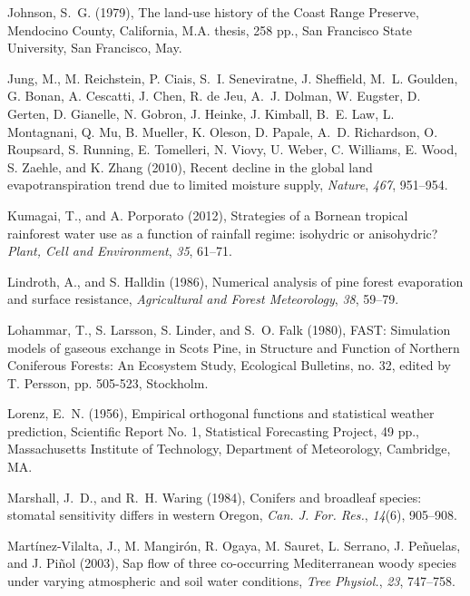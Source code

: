 Johnson, S.~G. (1979), The land-use history of the Coast Range Preserve, Mendocino County, California, 
M.A. thesis, 258 pp., San Francisco State University, San Francisco, May.

Jung, M., M. Reichstein, P. Ciais, S.~I. Seneviratne, J. Sheffield, M.~L. Goulden, G. Bonan, A. Cescatti, J. Chen, R. de Jeu, A.~J. Dolman, W. Eugster, D. Gerten, D. Gianelle, N. Gobron, J. Heinke, J. Kimball, B.~E. Law, L. Montagnani, Q. Mu, B. Mueller, K. Oleson, D. Papale, A.~D. Richardson, O. Roupsard, S. Running, E. Tomelleri, N. Viovy, U. Weber, C. Williams, E. Wood, S. Zaehle, and K. Zhang (2010), Recent decline in the global land evapotranspiration trend due to limited moisture supply, 
\textit{Nature}, \textit{467}, 951--954.

Kumagai, T., and A. Porporato (2012), Strategies of a Bornean tropical rainforest water use as a function of rainfall regime: isohydric or anisohydric? 
\textit{Plant, Cell and Environment}, \textit{35}, 61--71.

Lindroth, A., and S. Halldin (1986), Numerical analysis of pine forest evaporation and surface resistance, 
\textit{Agricultural and Forest Meteorology}, \textit{38}, 59--79.

Lohammar, T., S. Larsson, S. Linder, and S.~O. Falk (1980), FAST: Simulation models of gaseous exchange in Scots Pine, 
in Structure and Function of Northern Coniferous Forests: An Ecosystem Study, Ecological Bulletins, no. 32, edited by T. Persson,
pp. 505-523, Stockholm.

Lorenz, E.~N. (1956), Empirical orthogonal functions and statistical weather prediction, 
Scientific Report No. 1, Statistical Forecasting Project, 49 pp., Massachusetts Institute of Technology, Department of Meteorology, Cambridge, MA.

Marshall, J.~D., and R.~H. Waring (1984), Conifers and broadleaf species: stomatal sensitivity differs in western Oregon,
\textit{Can. J. For. Res.}, \textit{14}(6), 905--908.

Mart\'inez-Vilalta, J., M. Mangir\'on, R. Ogaya, M. Sauret, L. Serrano, J. Pe\~nuelas, and J. Pi\~nol (2003), Sap flow of three co-occurring Mediterranean woody species under varying atmospheric and soil water conditions,
\textit{Tree Physiol.}, \textit{23}, 747--758.

